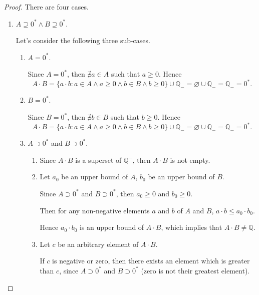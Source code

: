 \begin{proof}
    There are four cases.

    \begin{enumerate}[label={\textbf{Case \arabic*.}},itemindent={0.5cm}]
        \item $A\supseteq {0}^{*}\land B\supseteq {0}^{*}$.

              Let's consider the following three sub-cases.
              \begin{enumerate}
                  \item $A = {0}^{*}$.

                        Since $A = {0}^{*}$, then $\nexists a\in A$ such that $a\ge 0$. Hence
                        \[
                            A\cdot B = \{ a\cdot b: a\in A\land a\ge 0\land b\in B\land b\ge 0 \} \cup\mathbb{Q}_{-} = \varnothing\cup\mathbb{Q}_{-} = \mathbb{Q}_{-} = {0}^{*}.
                        \]
                  \item $B = {0}^{*}$.

                        Since $B = {0}^{*}$, then $\nexists b\in B$ such that $b\ge 0$. Hence
                        \[
                            A\cdot B = \{ a\cdot b: a\in A\land a\ge 0\land b\in B\land b\ge 0 \} \cup\mathbb{Q}_{-} = \varnothing\cup\mathbb{Q}_{-} = \mathbb{Q}_{-} = {0}^{*}.
                        \]
                  \item $A\supset{0}^{*}$ and $B\supset{0}^{*}$.
                        \begin{enumerate}[label = (\roman*)]
                            \item Since $A\cdot B$ is a superset of $\mathbb{Q}^{-}$, then $A\cdot B$ is not empty.
                            \item Let $a_{0}$ be an upper bound of $A$, $b_{0}$ be an upper bound of $B$.

                                  Since $A\supset{0}^{*}$ and $B\supset{0}^{*}$, then $a_{0}\ge 0$ and $b_{0}\ge 0$.

                                  Then for any non-negative elements $a$ and $b$ of $A$ and $B$, $a\cdot b \le a_{0}\cdot b_{0}$.

                                  Hence $a_{0}\cdot b_{0}$ is an upper bound of $A\cdot B$, which implies that $A\cdot B\ne\mathbb{Q}$.
                            \item Let $c$ be an arbitrary element of $A\cdot B$.

                                  If $c$ is negative or zero, then there exists an element which is greater than $c$, since $A\supset {0}^{*}$ and $B\supset {0}^{*}$ (zero is not their greatest element).


\end{enumerate}
\end{enumerate}
\end{enumerate}
\end{proof}
